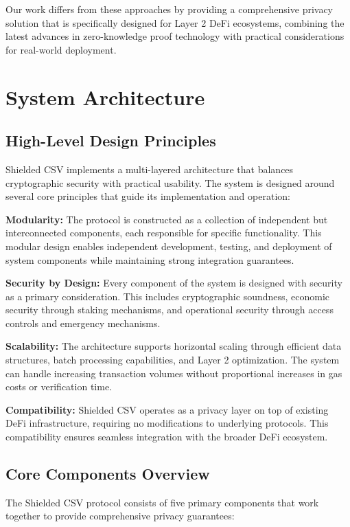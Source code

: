 \documentclass[11pt,a4paper]{article}
\begin{document}
Our work differs from these approaches by providing a comprehensive privacy solution that is specifically designed for Layer 2 DeFi ecosystems, combining the latest advances in zero-knowledge proof technology with practical considerations for real-world deployment.

\section{System Architecture}

\subsection{High-Level Design Principles}

Shielded CSV implements a multi-layered architecture that balances cryptographic security with practical usability. The system is designed around several core principles that guide its implementation and operation:

\textbf{Modularity:} The protocol is constructed as a collection of independent but interconnected components, each responsible for specific functionality. This modular design enables independent development, testing, and deployment of system components while maintaining strong integration guarantees.

\textbf{Security by Design:} Every component of the system is designed with security as a primary consideration. This includes cryptographic soundness, economic security through staking mechanisms, and operational security through access controls and emergency mechanisms.

\textbf{Scalability:} The architecture supports horizontal scaling through efficient data structures, batch processing capabilities, and Layer 2 optimization. The system can handle increasing transaction volumes without proportional increases in gas costs or verification time.

\textbf{Compatibility:} Shielded CSV operates as a privacy layer on top of existing DeFi infrastructure, requiring no modifications to underlying protocols. This compatibility ensures seamless integration with the broader DeFi ecosystem.

\subsection{Core Components Overview}

The Shielded CSV protocol consists of five primary components that work together to provide comprehensive privacy guarantees:
\end{document}
